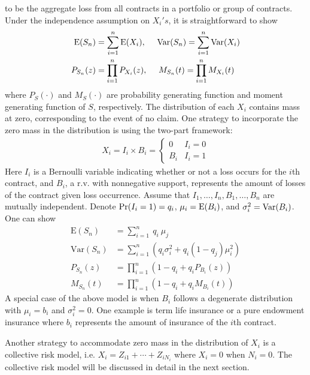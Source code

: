 \documentclass[]{book}
\theoremstyle{definition}
\theoremstyle{definition}
\theoremstyle{definition}
\theoremstyle{remark}
\begin{document}
to be the aggregate loss from all contracts in a portfolio or group of
contracts. Under the independence assumption on \(X_i's\), it is
straightforward to show \[\begin{aligned}
    {\rm E}(S_n) &= \sum_{i=1}^{n} {\rm E}(X_i),~~~~
    {\rm Var}(S_n) = \sum_{i=1}^{n} {\rm Var}(X_i)\\
    P_{S_n}(z) &= \prod_{i=1}^{n}P_{X_i}(z), ~~~~
    M_{S_n}(t) = \prod_{i=1}^{n}M_{X_i}(t) \\
 \end{aligned}\] where \(P_S(\cdot)\) and \(M_S(\cdot)\) are probability
generating function and moment generating function of \(S\),
respectively. The distribution of each \(X_i\) contains mass at zero,
corresponding to the event of no claim. One strategy to incorporate the
zero mass in the distribution is using the two-part framework:
\[\begin{aligned}
X_i = I_i\times B_i = \left\{\begin{array}{ll}
                               0 & I_i=0 \\
                               B_i & I_i=1
                             \end{array}
             \right.
\end{aligned}\] Here \(I_i\) is a Bernoulli variable indicating whether
or not a loss occurs for the \(i\)th contract, and \(B_i\), a r.v. with
nonnegative support, represents the amount of losses of the contract
given loss occurrence. Assume that \(I_1 ,\ldots,I_n ,B_1 ,\ldots,B_n\)
are mutually independent. Denote \({\rm Pr} (I_i =1)=q_i\),
\(\mu_i={\rm E}(B_i)\), and \(\sigma_i^2={\rm Var}(B_i)\). One can show
\[\begin{aligned}
\mathrm{E}(S_n)& =\sum_{i=1}^n ~q_i  ~\mu _j \\
\mathrm{Var}(S_n) & =\sum_{i=1}^n \left( q_i \sigma _i^2+q_i (1-q_j)\mu_i^2 \right)\\
P_{S_n}(z) & =\prod_{i=1}^n \left( 1-q_i+q_i P_{B_i}(z) \right)\\
M_{S_n}(t) & =\prod_{i=1}^n \left( 1-q_i+q_i M_{B_i}(t) \right)
\end{aligned}\] A special case of the above model is when \(B_i\)
follows a degenerate distribution with \(\mu_i=b_i\) and
\(\sigma^2_i=0\). One example is term life insurance or a pure endowment
insurance where \(b_i\) represents the amount of insurance of the
\(i\)th contract.

Another strategy to accommodate zero mass in the distribution of \(X_i\)
is a collective risk model, i.e. \(X_i=Z_{i1}+\cdots+Z_{iN_i}\) where
\(X_i=0\) when \(N_i=0\). The collective risk model will be discussed in
detail in the next section.
\end{document}
